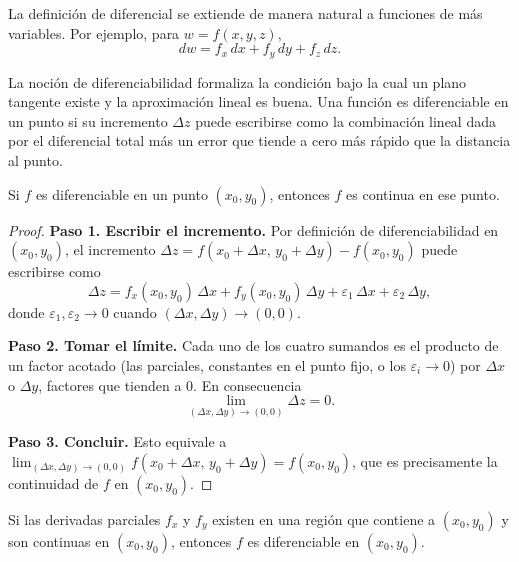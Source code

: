 \begin{rem}
La definición de diferencial se extiende de manera natural a funciones de más variables. Por ejemplo, para $w = f(x, y, z)$,
\[
dw = f_x \, dx + f_y \, dy + f_z \, dz.
\]
\end{rem}

\begin{rem}
La noción de diferenciabilidad formaliza la condición bajo la cual un plano tangente existe y la aproximación lineal es buena. Una función es diferenciable en un punto si su incremento $\Delta z$ puede escribirse como la combinación lineal dada por el diferencial total más un error que tiende a cero más rápido que la distancia al punto.
\end{rem}

\begin{theorem}
Si $f$ es diferenciable en un punto $(x_0, y_0)$, entonces $f$ es continua en ese punto.
\end{theorem}
\begin{proof}
\textbf{Paso 1. Escribir el incremento.} Por definición de diferenciabilidad en
$(x_0,y_0)$, el incremento $\Delta z=f(x_0+\Delta x,\,y_0+\Delta y)-f(x_0,y_0)$
puede escribirse como
\[
  \Delta z=f_x(x_0,y_0)\,\Delta x+f_y(x_0,y_0)\,\Delta y
           +\varepsilon_1\,\Delta x+\varepsilon_2\,\Delta y,
\]
donde $\varepsilon_1,\varepsilon_2\to 0$ cuando $(\Delta x,\Delta y)\to(0,0)$.

\textbf{Paso 2. Tomar el límite.} Cada uno de los cuatro sumandos es el producto
de un factor acotado (las parciales, constantes en el punto fijo, o los
$\varepsilon_i\to 0$) por $\Delta x$ o $\Delta y$, factores que tienden a $0$.
En consecuencia
\[
  \lim_{(\Delta x,\Delta y)\to(0,0)}\Delta z=0.
\]

\textbf{Paso 3. Concluir.} Esto equivale a
$\displaystyle\lim_{(\Delta x,\Delta y)\to(0,0)}f(x_0+\Delta x,\,y_0+\Delta y)=f(x_0,y_0)$,
que es precisamente la continuidad de $f$ en $(x_0,y_0)$.
\end{proof}

\begin{theorem}
Si las derivadas parciales $f_x$ y $f_y$ existen en una región que contiene a $(x_0, y_0)$ y son continuas en $(x_0, y_0)$, entonces $f$ es diferenciable en $(x_0, y_0)$.
\end{theorem}

